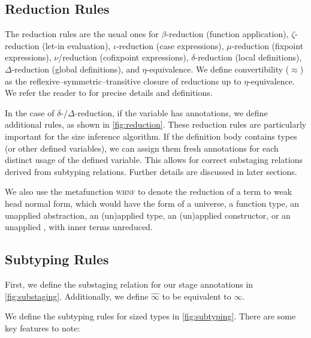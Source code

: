\documentclass[nonacm,screen,10pt]{acmart}
\begin{document}
\subsection{Reduction Rules}



The reduction rules are the usual ones for $\beta$-reduction (function application), $\zeta$-reduction (let-in evaluation), $\iota$-reduction (case expressions), $\mu$-reduction (fixpoint expressions), $\nu$\-/reduction (cofixpoint expressions), $\delta$-reduction (local definitions), $\Delta$-reduction (global definitions), and $\eta$-equivalence. We define convertibility ($\approx$) as the reflexive--symmetric--transitive closure of reductions up to $\eta$-equivalence. We refer the reader to \cite{cic-hat-bar, cic-hat, cc-hat-omega, coq} for precise details and definitions.

In the case of $\delta$-/$\Delta$-reduction, if the variable has annotations, we define additional rules, as shown in \autoref{fig:reduction}. These reduction rules are particularly important for the size inference algorithm. If the definition body contains \coinductive types (or other defined variables), we can assign them fresh annotations for each distinct usage of the defined variable. This allows for correct substaging relations derived from subtyping relations. Further details are discussed in later sections.

We also use the metafunction \textsc{whnf} to denote the reduction of a term to weak head normal form, which would have the form of a universe, a function type, an unapplied abstraction, an (un)applied \coinductive type, an (un)applied constructor, or an unapplied \cofixpoint, with inner terms unreduced.

\subsection{Subtyping Rules}



First, we define the substaging relation for our stage annotations in \autoref{fig:substaging}. Additionally, we define $\widehat{\infty}$ to be equivalent to $\infty$.



We define the subtyping rules for sized types in \autoref{fig:subtyping}. There are some key features to note:
\end{document}

